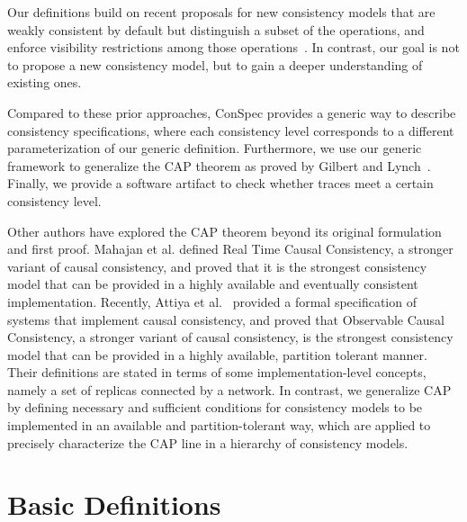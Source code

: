 \documentclass[journal,compsoc]{IEEEtran}
\begin{document}
Our definitions build on recent proposals for new consistency models that are weakly consistent by default but distinguish a subset of the operations, and enforce visibility restrictions among those operations~\cite{Li:2012:MGS:2387880.2387906, Gotsman:2016:CIS:2837614.2837625, cheng-papoc}. In contrast, our goal is not to propose a new consistency model, but to gain a deeper understanding of existing ones.

Compared to these prior approaches, ConSpec provides a generic way to describe consistency specifications, where each consistency level corresponds to a different parameterization of our generic definition. Furthermore, we use our generic framework to generalize the CAP theorem as proved by Gilbert and Lynch~\cite{Gilbert:2002:BCF:564585.564601}. Finally, we provide a software artifact to check whether traces meet a certain consistency level.


Other authors have explored the CAP theorem beyond its original formulation and first proof. 
Mahajan et al. \cite{mahajan11cacTR} defined Real Time Causal Consistency, a stronger variant of causal consistency, and proved that it is the strongest consistency model that can be provided in a highly available and eventually consistent implementation.  
Recently, Attiya et al.~\cite{Attiya:2015:LHE:2767386.2767419}  provided a formal specification of systems that implement causal consistency, and proved that Observable Causal Consistency, a stronger variant of causal consistency, is the strongest consistency model that can be provided in a highly available, partition tolerant manner. Their definitions are stated in terms of some implementation-level concepts, namely a set of replicas connected by a network.
In contrast, we generalize CAP by defining necessary and sufficient conditions for consistency models to be implemented in an available and partition-tolerant way, which are applied to precisely characterize the CAP line in a hierarchy of consistency models.

  \section{Basic Definitions} \label{sec:definitions}


\end{document}
